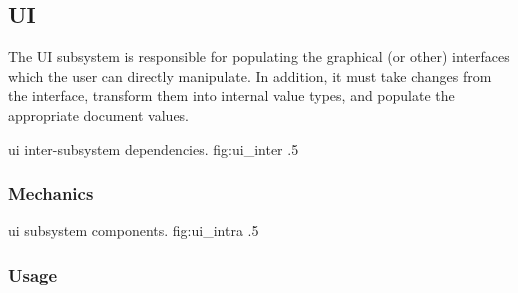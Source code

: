 \subsection{UI}
The UI subsystem is responsible for populating the graphical (or other) interfaces which the user can directly manipulate.
In addition, it must take changes from the interface, transform them into internal value types, and populate the appropriate document values.

{ui inter-subsystem dependencies.}
{fig:ui_inter}
{.5}

\subsubsection{Mechanics}
{ui subsystem components.}
{fig:ui_intra}
{.5}


\subsubsection{Usage}